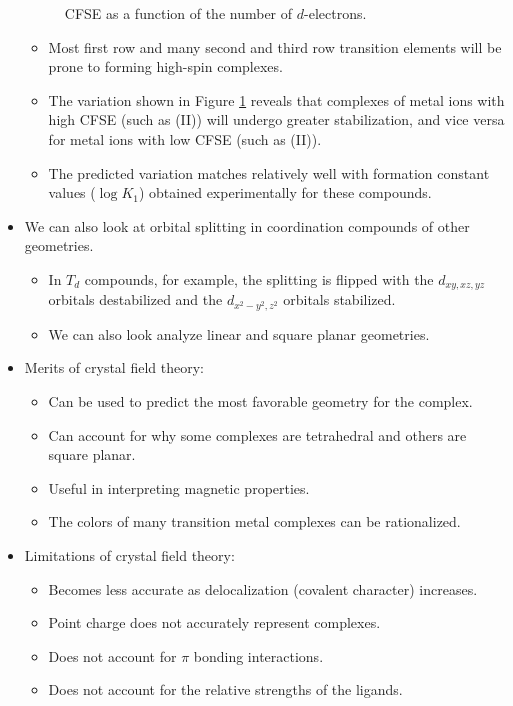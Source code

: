 \documentclass[../notes.tex]{subfiles}
\begin{document}
\begin{itemize}
\begin{figure}[H]
        \caption{CFSE as a function of the number of $d$-electrons.}
        \label{fig:CFSEcurve}
    \end{figure}
    \begin{itemize}
        \item Most first row and many second and third row transition elements will be prone to forming high-spin complexes.
        \item The variation shown in Figure \ref{fig:CFSEcurve} reveals that complexes of metal ions with high CFSE (such as  (II)) will undergo greater stabilization, and vice versa for metal ions with low CFSE (such as  (II)).
        \item The predicted variation matches relatively well with formation constant values ($\log K_1$) obtained experimentally for these compounds.
    \end{itemize}
    \item We can also look at orbital splitting in coordination compounds of other geometries.
    \begin{itemize}
        \item In $T_d$ compounds, for example, the splitting is flipped with the $d_{xy,xz,yz}$ orbitals destabilized and the $d_{x^2-y^2,z^2}$ orbitals stabilized.
        \item We can also look analyze linear and square planar geometries.
    \end{itemize}
    \item Merits of crystal field theory:
    \begin{itemize}
        \item Can be used to predict the most favorable geometry for the complex.
        \item Can account for why some complexes are tetrahedral and others are square planar.
        \item Useful in interpreting magnetic properties.
        \item The colors of many transition metal complexes can be rationalized.
    \end{itemize}
    \item Limitations of crystal field theory:
    \begin{itemize}
        \item Becomes less accurate as delocalization (covalent character) increases.
        \item Point charge does not accurately represent complexes.
        \item Does not account for $\pi$ bonding interactions.
        \item Does not account for the relative strengths of the ligands.
    \end{itemize}
\end{itemize}
\end{document}
